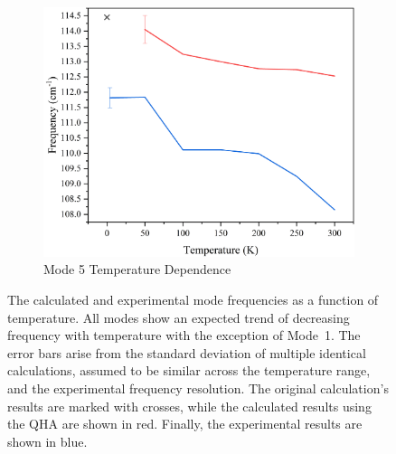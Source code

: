 \begin{figure}
\begin{subfigure}{0.45\textwidth}
\centering
\includegraphics[width=\textwidth]{Figures/Misc/QHA/Mode5CompV2G.png}
\caption{Mode 5 Temperature Dependence}
\label{fig:mode5temp}
\end{subfigure}
\captionsetup{font = footnotesize, justification = centering}
\caption[The Calculated and Experimental Mode Frequencies as a Function of Temperature]{The calculated and experimental mode frequencies as a function of temperature. All modes show an expected trend of decreasing frequency with temperature with the exception of Mode~1. The error bars arise from the standard deviation of multiple identical calculations, assumed to be similar across the temperature range, and the experimental frequency resolution. The original calculation's results are marked with crosses, while the calculated results using the QHA are shown in red. Finally, the experimental results are shown in blue.}
\label{Fig:ModeTempShift}
\end{figure}

